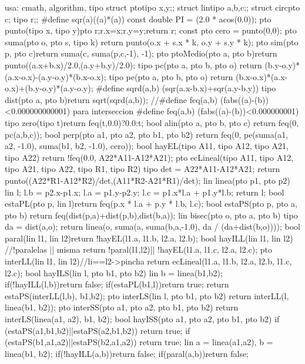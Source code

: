 \documentclass[10pt,landscape,twocolumn,a4paper,notitlepage]{article}
\begin{document}
\begin{code}
usa: cmath, algorithm, tipo
struct pto{tipo x,y;};
struct lin{tipo a,b,c;};
struct circ{pto c; tipo r;};
#define sqr(a)((a)*(a))
const double PI = (2.0 * acos(0.0));
pto punto(tipo x, tipo y){pto r;r.x=x;r.y=y;return r;}
const pto cero = punto(0,0);
pto suma(pto o, pto s, tipo k){
  return punto(o.x + s.x * k, o.y + s.y * k);
}
pto sim(pto p, pto c){return suma(c, suma(p,c,-1), -1);}
pto ptoMedio(pto a, pto b){return punto((a.x+b.x)/2.0,(a.y+b.y)/2.0);}
tipo pc(pto a, pto b, pto o){
  return (b.y-o.y)*(a.x-o.x)-(a.y-o.y)*(b.x-o.x);
}
tipo pe(pto a, pto b, pto o){
  return (b.x-o.x)*(a.x-o.x)+(b.y-o.y)*(a.y-o.y);
}
#define sqrd(a,b) (sqr(a.x-b.x)+sqr(a.y-b.y))
tipo dist(pto a, pto b){return sqrt(sqrd(a,b));}
//#define feq(a,b) (fabs((a)-(b))<0.000000000001) para interseccion
#define feq(a,b) (fabs((a)-(b))<0.000000001)
tipo zero(tipo t){return feq(t,0.0)?0.0:t;}
bool alin(pto a, pto b, pto c){  return feq(0, pc(a,b,c));}
bool perp(pto a1, pto a2, pto b1, pto b2){
  return feq(0, pe(suma(a1, a2, -1.0), suma(b1, b2, -1.0), cero));
}
bool hayEL(tipo A11, tipo A12, tipo A21, tipo A22){
  return !feq(0.0, A22*A11-A12*A21);
}
pto ecLineal(tipo A11, tipo A12, tipo A21, tipo A22, tipo R1, tipo R2){
  tipo det = A22*A11-A12*A21;
  return punto((A22*R1-A12*R2)/det,(A11*R2-A21*R1)/det);
}
lin linea(pto p1, pto p2){
  lin l;
  l.b = p2.x-p1.x;
  l.a = p1.y-p2.y;
  l.c = p1.x*l.a + p1.y*l.b;
  return l;
}
bool estaPL(pto p, lin l){return feq(p.x * l.a + p.y * l.b, l.c);}
bool estaPS(pto p, pto a, pto b){
  return feq(dist(p,a)+dist(p,b),dist(b,a));
}
lin bisec(pto o, pto a, pto b){
  tipo da = dist(a,o);
  return linea(o, suma(a, suma(b,a,-1.0), da / (da+dist(b,o))));
}
bool paral(lin l1, lin l2){return !hayEL(l1.a, l1.b, l2.a, l2.b);}
bool hayILL(lin l1, lin l2){ //!paralelas || misma
  return !paral(l1,l2)|| !hayEL(l1.a, l1.c, l2.a, l2.c);
}
pto interLL(lin l1, lin l2){//li==l2->pincha
  return ecLineal(l1.a, l1.b, l2.a, l2.b, l1.c, l2.c);
}
bool hayILS(lin l, pto b1, pto b2){
  lin b = linea(b1,b2);
  if(!hayILL(l,b))return false;
  if(estaPL(b1,l))return true;
  return estaPS(interLL(l,b), b1,b2);
}
pto interLS(lin l, pto b1, pto b2){
  return interLL(l, linea(b1, b2));
}
pto interSS(pto a1, pto a2, pto b1, pto b2){
  return interLS(linea(a1, a2), b1, b2);
}
bool hayISS(pto a1, pto a2, pto b1, pto b2){
  if (estaPS(a1,b1,b2)||estaPS(a2,b1,b2)) return true;
  if (estaPS(b1,a1,a2)||estaPS(b2,a1,a2)) return true;
  lin a = linea(a1,a2), b = linea(b1, b2);
  if(!hayILL(a,b))return false;
  if(paral(a,b))return false;
}
\end{code}
\end{document}

